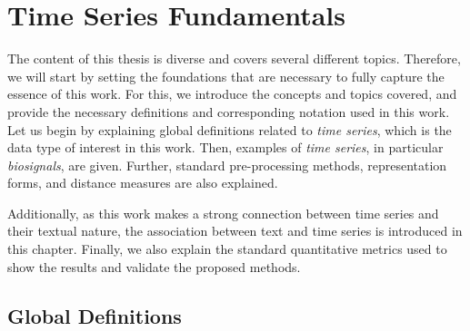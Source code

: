 
%

\chapter{Time Series Fundamentals}
\label{cha:theory}

The content of this thesis is diverse and covers several different topics. Therefore, we will start by setting the foundations that are necessary to fully capture the essence of this work. For this, we introduce the concepts and topics covered, and provide the necessary definitions and corresponding notation used in this work. Let us begin by explaining global definitions related to \textit{time series}, which is the data type of interest in this work. Then, examples of \textit{time series}, in particular \textit{biosignals}, are given. Further, standard pre-processing methods, representation forms, and distance measures are also explained.
\par
Additionally, as this work makes a strong connection between time series and their textual nature, the association between text and time series is introduced in this chapter. Finally, we also explain the standard quantitative metrics used to show the results and validate the proposed methods.

\section{Global Definitions}
\label{sec:global}

